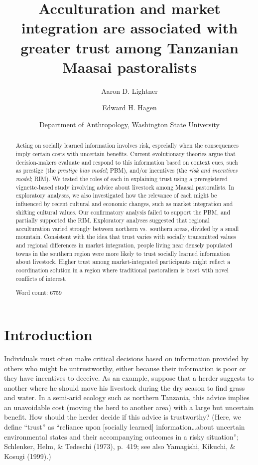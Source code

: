 \documentclass[
  11pt,
]{article}
\title{\LARGE \textbf{Acculturation and market integration are associated with greater trust among Tanzanian Maasai pastoralists}}
\author{Aaron D. Lightner \and Edward H. Hagen \and Department of Anthropology, Washington State University}
\date{}
\begin{document}
\maketitle
\begin{abstract}
Acting on socially learned information involves risk, especially when
the consequences imply certain costs with uncertain benefits. Current
evolutionary theories argue that decision-makers evaluate and respond to
this information based on context cues, such as prestige (the
\emph{prestige bias model}; PBM), and/or incentives (the \emph{risk and
incentives model}; RIM). We tested the roles of each in explaining trust
using a preregistered vignette-based study involving advice about
livestock among Maasai pastoralists. In exploratory analyses, we also
investigated how the relevance of each might be influenced by recent
cultural and economic changes, such as market integration and shifting
cultural values. Our confirmatory analysis failed to support the PBM,
and partially supported the RIM. Exploratory analyses suggested that
regional acculturation varied strongly between northern vs.~southern
areas, divided by a small mountain. Consistent with the idea that trust
varies with socially transmitted values and regional differences in
market integration, people living near densely populated towns in the
southern region were more likely to trust socially learned information
about livestock. Higher trust among market-integrated participants might
reflect a coordination solution in a region where traditional
pastoralism is beset with novel conflicts of interest.

Word count: 6759
\end{abstract}


\newpage


\hypertarget{introduction}{%
\section{Introduction}\label{introduction}}

Individuals must often make critical decisions based on information
provided by others who might be untrustworthy, either because their
information is poor or they have incentives to deceive. As an example,
suppose that a herder suggests to another where he should move his
livestock during the dry season to find grass and water. In a semi-arid
ecology such as northern Tanzania, this advice implies an unavoidable
cost (moving the herd to another area) with a large but uncertain
benefit. How should the herder decide if this advice is trustworthy?
(Here, we define ``trust'' as ``reliance upon {[}socially learned{]}
information\ldots about uncertain environmental states and their
accompanying outcomes in a risky situation''; Schlenker, Helm, \&
Tedeschi (1973), p.~419; see also Yamagishi, Kikuchi, \& Kosugi (1999).)
\end{document}
